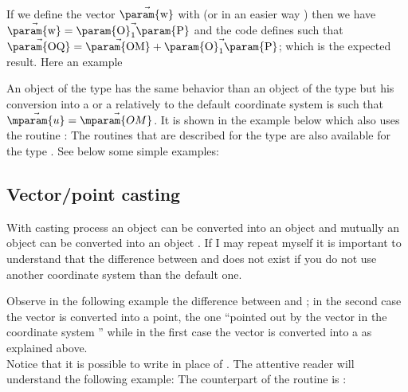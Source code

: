\documentclass[pdftex]{article}
\begin{document}
{}
If we define the vector  $\vec{\mbox{\param{w}}}$ with  (or in an easier way
) then we have
$\vec{\mbox{\param{w}}}=\vec{\mbox{\param{O}}_{1}\mbox{\param{P}}}$
and the code  defines   such that
$\vec{\mbox{\param{OQ}}}=\vec{\mbox{\param{OM}}}+\vec{\mbox{\param{O}}_{1}\mbox{\param{P}}}$;
which is the expected result. Here an example

{}
An object  of the type  has the same behavior
than an object of the type  but his conversion into
a  or a   relatively to the default
coordinate system is such that
$\vec{\mparam{u}}=\vec{\mparam{OM}}$. It is shown in the example below
which also uses the routine  :
{}
The routines that are described for the type  are also
available for the type . See below some simple examples:
\subsection{Vector/point casting}

With casting process an object  can be
converted into an object  and mutually
an object  can be converted into an object
. If I may repeat myself it is important to
understand that the difference between  and 
does not exist if you do not use another coordinate system than the
default one.


Observe in the following example the difference between   and
; in the second case the vector is converted into
a point, the one ``pointed out by the vector in the coordinate
system '' while in the first case the
vector is converted into a  as explained above.\\
Notice that it is possible to write   in
place of .
The attentive reader will understand the following example:
The counterpart of the routine   is
:
\end{document}
